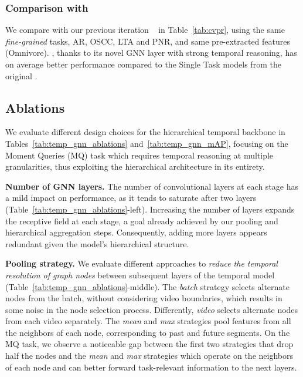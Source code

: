 \subsubsection{Comparison with \ourscvpr}\label{sec:comparisonCVPR}

We compare \ours with our previous iteration \ourscvpr~\cite{egopack} in Table~\ref{tab:cvpr}, using the same \emph{fine-grained} tasks, \ie AR, OSCC, LTA and PNR, and same pre-extracted features (Omnivore).
\ours, thanks to its novel GNN layer with strong temporal reasoning, has on average better performance compared to the Single Task models from the original \ourscvpr.


\subsection{Ablations}
\label{sec:exp_ablations}


We evaluate different design choices for the hierarchical temporal backbone in Tables~\ref{tab:temp_gnn_ablations} and~\ref{tab:temp_gnn_mAP}, focusing on the Moment Queries (MQ) task which requires temporal reasoning at multiple granularities, thus exploiting the hierarchical architecture in its entirety.
%
%

\smallskip
\smallskip
\noindent\textbf{Number of GNN layers.}
The number of convolutional layers at each stage has a mild impact on performance, as it tends to saturate after two layers (Table~\ref{tab:temp_gnn_ablations}-left).
Increasing the number of layers expands the receptive field at each stage, a goal already achieved by our pooling and hierarchical aggregation steps.
Consequently, adding more layers appears redundant given the model’s hierarchical structure.
%
%


\smallskip
\smallskip
\noindent\textbf{Pooling strategy.} We evaluate different approaches to \textit{reduce the temporal resolution of graph nodes} between subsequent layers of the temporal model (Table~\ref{tab:temp_gnn_ablations}-middle).
The \textit{batch} strategy selects alternate nodes from the batch, without considering video boundaries, which results in some noise in the node selection process.
Differently, \textit{video} selects alternate nodes from each video separately.
The \textit{mean} and \textit{max} strategies pool features from all the neighbors of each node, corresponding to past and future segments.
On the MQ task, we observe a noticeable gap between the first two strategies that drop half the nodes and the \textit{mean} and \textit{max} strategies which operate on the neighbors of each node and can better forward task-relevant information to the next layers.
%
%

